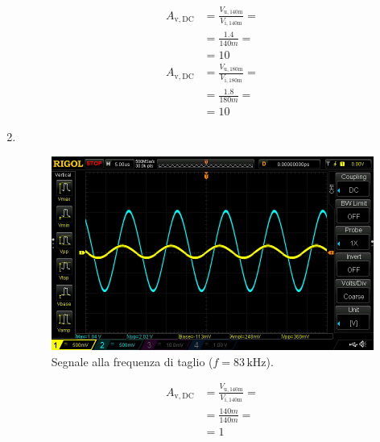 \documentclass[a4paper]{article}
\begin{document}
\begin{enumerate}[label=\alph*.]
\begin{equation*}
						\begin{split}
							A_{\mathrm{v, DC}} &= \frac{V_{\mathrm{u, 140m}}}{V_{\mathrm{i, 140m}}} = \\
											   &= \frac{1.4}{140m} = \\
											   &= 10
						\end{split}
					\end{equation*}
					\begin{equation*}
						\begin{split}
							A_{\mathrm{v, DC}} &= \frac{V_{\mathrm{u, 180m}}}{V_{\mathrm{i, 180m}}} = \\
											   &= \frac{1.8}{180m} = \\
											   &= 10
						\end{split}
					\end{equation*}
				\item \ 
					\newline
					\newpage
					\begin{figure}[h!]
						\centering
						\includegraphics[scale=0.4]{frequenzaDiTaglioC4}
						\caption{Segnale alla frequenza di taglio ($ f = 83 \, \mathrm{kHz} $).}
						\label{fig:frequenzaDiTaglioC4}
					\end{figure}
					\newline
					\begin{equation*}
						\begin{split}
							A_{\mathrm{v, DC}} &= \frac{V_{\mathrm{u, 140m}}}{V_{\mathrm{i, 140m}}} = \\
											   &= \frac{140m}{140m} = \\
											   &= 1
						\end{split}
					\end{equation*}
					\begin{equation*}

\end{equation*}
\end{enumerate}
\end{document}
